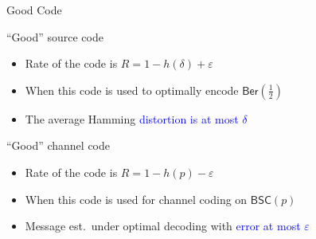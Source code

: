\documentclass[10pt,presentation]{beamer}
\begin{document}
\begin{frame}{Good Code}
  \begin{block}{``Good'' source code}
    \begin{itemize}
    \item Rate of the code is $R=1-h(\delta)+\varepsilon$
    \item When this code is used to \alert{optimally encode} $\mathsf{Ber}(\tfrac{1}{2})$
    \item The average Hamming \textcolor{blue}{distortion is at most $\delta$}
    \end{itemize}
  \end{block}
  \vspace{0.4cm}
  \begin{block}{``Good'' channel code}
    \begin{itemize}
    \item Rate of the code is $R=1-h(p)-\varepsilon$
    \item When this code is used for channel coding on $\mathsf{BSC}(p)$
    \item Message est.~under \alert{optimal decoding} with \textcolor{blue}{error at most $\varepsilon$}
    \end{itemize}
  \end{block}
\end{frame}
\end{document}

